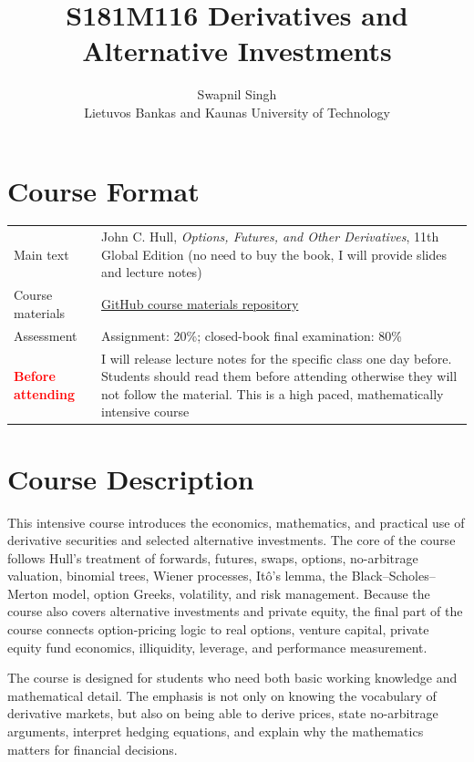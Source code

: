 \documentclass[11pt]{article}
\title{\textbf{S181M116 Derivatives and Alternative Investments}}
\author{Swapnil Singh \\ Lietuvos Bankas and Kaunas University of Technology}
\date{}
\begin{document}
\maketitle

\section*{Course Format}

\begin{tabular}{@{}p{}p{}@{}}
\toprule
Main text & John C. Hull, \emph{Options, Futures, and Other Derivatives}, 11th Global Edition (no need to buy the book, I will provide slides and lecture notes) \\
Course materials & \href{https://github.com/swapnil1987/derivatives-alternative-investment}{GitHub course materials repository} \\
Assessment & Assignment: 20\%; closed-book final examination: 80\% \\
\textbf{\textcolor{red}{Before attending}} & I will release lecture notes for the specific class one day before. Students should read them before attending otherwise they will not follow the material. This is a high paced, mathematically intensive course\\
\bottomrule
\end{tabular}

\section*{Course Description}

This intensive course introduces the economics, mathematics, and practical use of derivative securities and selected alternative investments. The core of the course follows Hull's treatment of forwards, futures, swaps, options, no-arbitrage valuation, binomial trees, Wiener processes, It\^o's lemma, the Black--Scholes--Merton model, option Greeks, volatility, and risk management. Because the course also covers alternative investments and private equity, the final part of the course connects option-pricing logic to real options, venture capital, private equity fund economics, illiquidity, leverage, and performance measurement.

The course is designed for students who need both basic working knowledge and mathematical detail. The emphasis is not only on knowing the vocabulary of derivative markets, but also on being able to derive prices, state no-arbitrage arguments, interpret hedging equations, and explain why the mathematics matters for financial decisions.
\end{document}
